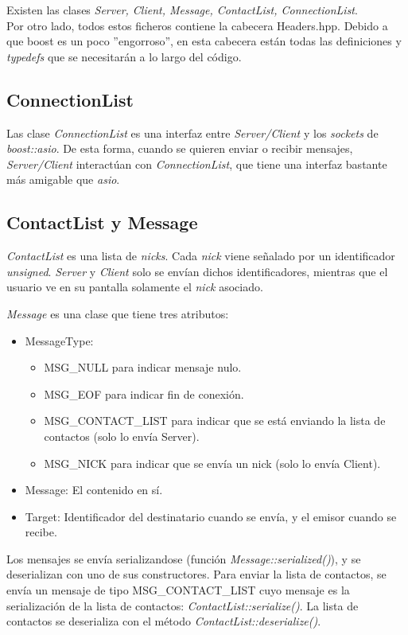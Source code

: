 \documentclass[a4paper,11pt,titlepage,halfparskip,cleardoubleempty]{scrbook}
\begin{document}
  Existen las clases \textit{Server, Client, Message, ContactList, ConnectionList}. \\
Por otro lado,  todos estos ficheros contiene la cabecera Headers.hpp. Debido a que boost es un poco
  ''engorroso'', en esta cabecera están todas las definiciones y \textit{typedefs} que se necesitarán
  a lo largo del código.\\

\subsection{ConnectionList}
  Las clase \textit{ConnectionList} es una interfaz entre \textit{Server/Client} y los \textit{sockets} de
  \textit{boost::asio}. De esta forma, cuando se quieren enviar o recibir mensajes, \textit{Server/Client}
  interactúan con \textit{ConnectionList}, que tiene una interfaz bastante más amigable  que \textit{asio}.

  \subsection{ContactList y Message}
  \textit{ContactList} es una lista de \textit{nicks}. Cada \textit{nick} viene señalado por un identificador
  \textit{unsigned}. \textit{Server} y \textit{Client} solo se envían dichos identificadores, mientras que
  el usuario ve en su pantalla solamente el \textit{nick} asociado.

 \textit{Message} es una clase que tiene tres atributos:
\begin{itemize}
     \item MessageType:
\begin{itemize}
        \item MSG\_NULL para indicar mensaje nulo.

                    \item MSG\_EOF  para indicar fin de conexión.
                    \item MSG\_CONTACT\_LIST para indicar que se está enviando la lista
                             de contactos (solo lo envía Server).
                    \item MSG\_NICK para indicar que se envía un nick (solo lo envía Client).
            \end{itemize}
     \item Message: El contenido en sí.
     \item Target: Identificador del destinatario cuando se envía, y el emisor cuando se
               recibe.
\end{itemize}
   Los mensajes se envía serializandose (función \textit{Message::serialized()}), y se deserializan
   con uno de sus constructores.
  Para enviar la lista de contactos, se envía un mensaje
   de tipo MSG\_CONTACT\_LIST cuyo mensaje es la serialización de la lista de contactos:
   \textit{ContactList::serialize()}. La lista de contactos se deserializa con el método
   \textit{ContactList::deserialize()}.\\
\end{document}
